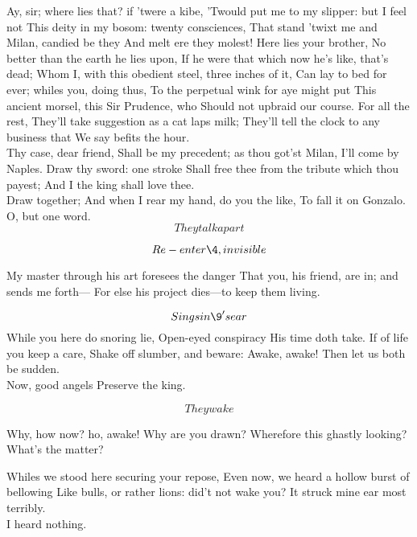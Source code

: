 \documentclass[11pt]{book}
\begin{document}
\7	Ay, sir; where lies that? if 'twere a kibe,
	'Twould put me to my slipper: but I feel not
	This deity in my bosom: twenty consciences,
	That stand 'twixt me and Milan, candied be they
	And melt ere they molest! Here lies your brother,
	No better than the earth he lies upon,
	If he were that which now he's like, that's dead;
	Whom I, with this obedient steel, three inches of it,
	Can lay to bed for ever; whiles you, doing thus,
	To the perpetual wink for aye might put
	This ancient morsel, this Sir Prudence, who
	Should not upbraid our course. For all the rest,
	They'll take suggestion as a cat laps milk;
	They'll tell the clock to any business that
	We say befits the hour. \\

\8	Thy case, dear friend,
	Shall be my precedent; as thou got'st Milan,
	I'll come by Naples. Draw thy sword: one stroke
	Shall free thee from the tribute which thou payest;
	And I the king shall love thee. \\

\7	Draw together;
	And when I rear my hand, do you the like,
	To fall it on Gonzalo. \\

\8	O, but one word.
	\[They talk apart\]

	\[Re-enter \4, invisible\]

\4	My master through his art foresees the danger
	That you, his friend, are in; and sends me forth---
	For else his project dies---to keep them living.

	\[Sings in \9's ear\]
{  \Locus \textus {+3em}
   \Forma {}
	While you here do snoring lie,
	Open-eyed conspiracy
	His time doth take.
	If of life you keep a care,
	Shake off slumber, and beware:
	Awake, awake!
}
\7	Then let us both be sudden. \\

\9	Now, good angels
	Preserve the king.

	\[They wake\]

\6	Why, how now? ho, awake! Why are you drawn?
	Wherefore this ghastly looking? \\

\9	What's the matter?

\8	Whiles we stood here securing your repose,
	Even now, we heard a hollow burst of bellowing
	Like bulls, or rather lions: did't not wake you?
	It struck mine ear most terribly. \\

\6	I heard nothing.
\end{document}
